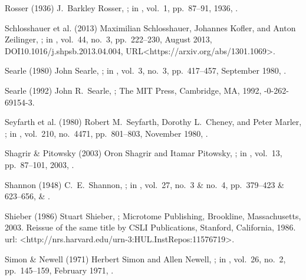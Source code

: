 \biblabel Rosser (1936)
J.\ Barkley Rosser,
;
in ,
vol.\ 1, pp.\ 87--91, 1936,
.

\biblabel Schlosshauer et al. (2013)
Maximilian Schlosshauer, Johannes Kofler, and Anton Zeilinger,
;
in ,
vol.\ 44, no.\ 3, pp.\ 222--230, August 2013,
DOI{10.1016/j.shpsb.2013.04.004},
URL<https://arxiv.org/abs/1301.1069>.

\biblabel Searle (1980)
John Searle,
;
in ,
vol.\ 3, no.\ 3, pp.\ 417--457, September 1980,
.

\biblabel Searle (1992)
John R.\ Searle,
;
The MIT Press, Cambridge, MA, 1992,
-0-262-69154-3.

\biblabel Seyfarth et al. (1980)
Robert M.\ Seyfarth, Dorothy L.\ Cheney, and Peter Marler,
;
in ,
vol.\ 210, no.\ 4471, pp.\ 801--803, November 1980,
.

\biblabel Shagrir \& Pitowsky (2003)
Oron Shagrir and Itamar Pitowsky,
;
in ,
vol.\ 13, pp.\ 87--101, 2003,
.

\biblabel Shannon (1948)
C.\ E.\ Shannon,
;
in ,
vol.\ 27, no.\ 3 \& no.\ 4, pp.\ 379--423 \& 623--656,
 \&
.

\biblabel Shieber (1986)
Stuart Shieber,
;
Microtome Publishing, Brookline, Massachusetts, 2003.
Reissue of the same title by
CSLI Publications, Stanford, California, 1986.\\
{\sc url:} \URL<http://nrs.harvard.edu/urn-3:HUL.InstRepos:11576719>.

\biblabel Simon \& Newell (1971)
Herbert Simon and Allen Newell,
;
in ,
 vol.\ 26, no.\ 2, pp.\ 145--159, February 1971,
.


